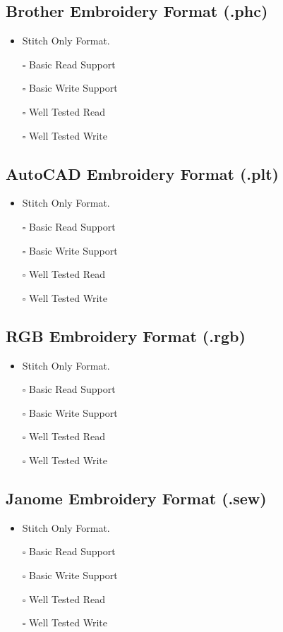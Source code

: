 \documentclass[onesize, a4paper]{refart}
\providecommand{\tightlist}{\setlength{\itemsep}{0pt}\setlength{\parskip}{0pt}}
\begin{document}
\subsection{Brother Embroidery Format (.phc)}

\begin{itemize}
\tightlist
\item Stitch Only Format.
\item[$\square$] Basic Read Support
\item[$\square$] Basic Write Support
\item[$\square$] Well Tested Read
\item[$\square$] Well Tested Write
\end{itemize}

\subsection{AutoCAD Embroidery Format (.plt)}

\begin{itemize}
\tightlist
\item Stitch Only Format.
\item[$\square$] Basic Read Support
\item[$\square$] Basic Write Support
\item[$\square$] Well Tested Read
\item[$\square$] Well Tested Write
\end{itemize}

\subsection{RGB Embroidery Format (.rgb)}

\begin{itemize}
\tightlist
\item Stitch Only Format.
\item[$\square$] Basic Read Support
\item[$\square$] Basic Write Support
\item[$\square$] Well Tested Read
\item[$\square$] Well Tested Write
\end{itemize}

\subsection{Janome Embroidery Format (.sew)}

\begin{itemize}
\tightlist
\item Stitch Only Format.
\item[$\square$] Basic Read Support
\item[$\square$] Basic Write Support
\item[$\square$] Well Tested Read
\item[$\square$] Well Tested Write
\end{itemize}
\end{document}
